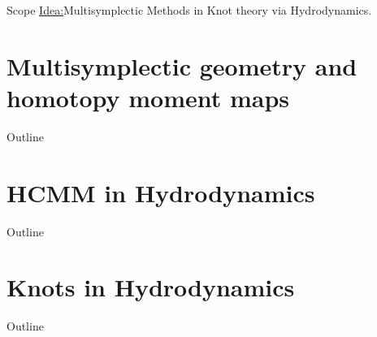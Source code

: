 \documentclass[handout,10pt]{beamer}
\newcommand{\checkpoint}[0]{
	
 	\begin{frame}{Outline}
  		\addtocounter{framenumber}{-1}
  		\tableofcontents[currentsection]
	\end{frame}
}
\begin{document}

\begin{frame}{Scope}
	\underline{Idea:}Multisymplectic Methods in Knot theory via Hydrodynamics.
	\vfill
\begin{center}
	
\end{center}
\end{frame}


\section{Multisymplectic geometry and homotopy moment maps} 
\checkpoint


\section{HCMM in Hydrodynamics}
\checkpoint


\section{Knots in Hydrodynamics}
\checkpoint




\end{document}
